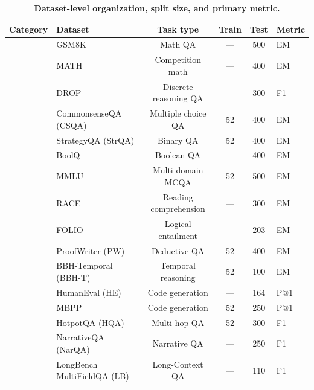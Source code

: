 \begin{table}[!b]
\centering
\vspace{-2mm}
\caption{\textbf{Dataset-level organization, split size, and primary metric.}}
\vspace{-2mm}
\label{tab:app_dataset_metrics}
\footnotesize
\setlength{\tabcolsep}{4.2pt}
\renewcommand{\arraystretch}{0.95}
\begin{tabular}{llcccl}
\toprule
\textbf{Category} & \textbf{Dataset} & \textbf{Task type} & \textbf{Train} & \textbf{Test} & \textbf{Metric} \\
\midrule

& GSM8K & Math QA & --- & 500 & EM \\
& MATH & Competition math & --- & 400 & EM \\
& DROP & Discrete reasoning QA & --- & 300 & F1 \\
\midrule

& CommonsenseQA (CSQA) & Multiple choice QA & 52 & 400 & EM \\
& StrategyQA (StrQA) & Binary QA & 52 & 400 & EM \\
& BoolQ & Boolean QA & --- & 400 & EM \\
& MMLU & Multi-domain MCQA & 52 & 500 & EM \\
& RACE & Reading comprehension & --- & 300 & EM \\
\midrule

& FOLIO & Logical entailment & --- & 203 & EM \\
& ProofWriter (PW) & Deductive QA & 52 & 400 & EM \\
& BBH-Temporal (BBH-T) & Temporal reasoning & 52 & 100 & EM \\
& HumanEval (HE) & Code generation & --- & 164 & P@1 \\
& MBPP & Code generation & 52 & 250 & P@1 \\
\midrule

& HotpotQA (HQA) & Multi-hop QA & 52 & 300 & F1 \\
& NarrativeQA (NarQA) & Narrative QA & --- & 250 & F1 \\
& LongBench MultiFieldQA (LB) & Long-Context QA & --- & 110 & F1 \\
\midrule


\end{tabular}
\end{table}
